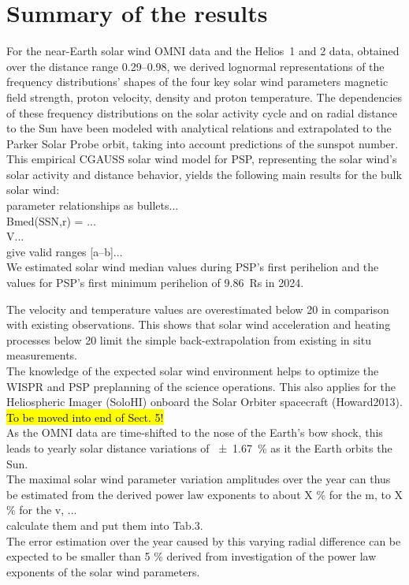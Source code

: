 \section{Summary of the results}
For the near-Earth solar wind OMNI data and the Helios~1 and 2 data, obtained over the distance range \SIrange{0.29}{0.98}{\au}, we derived lognormal representations of the frequency distributions’ shapes of the four key solar wind parameters magnetic field strength, proton velocity, density and proton temperature. The dependencies of these frequency distributions on the solar activity cycle and on radial distance to the Sun have been modeled with analytical relations and extrapolated to the Parker Solar Probe orbit, taking into account predictions of the sunspot number. This empirical CGAUSS solar wind model for PSP, representing the solar wind’s solar activity and distance behavior, yields the following main results for the bulk solar wind:\\

{\color{red}
parameter relationships as bullets...\\

Bmed(SSN,r) = ...\\
V...\\
give valid ranges [a--b]...\\
We estimated solar wind median values during PSP’s first perihelion and the values for PSP’s first minimum perihelion of 9.86~Rs in 2024.\\
}

The velocity and temperature values are overestimated below \SI{20}{\Rs} in comparison with existing observations. This shows that solar wind acceleration and heating processes below \SI{20}{\Rs} limit the simple back-extrapolation from existing in situ measurements.\\

The knowledge of the expected solar wind environment helps to optimize the WISPR and PSP preplanning of the science operations. This also applies for the Heliospheric Imager (SoloHI) onboard the Solar Orbiter spacecraft (Howard2013).\\




\hl{To be moved into end of Sect. 5!}\\
As the OMNI data are time-shifted to the nose of the Earth’s bow shock, this leads to yearly solar distance variations of \SI{+-1.67}{\%} as it the Earth orbits the Sun.\\
{\color{red}
The maximal solar wind parameter variation amplitudes over the year can thus be estimated from the derived power law exponents to about X \% for the m, to X \% for the v, ...\\
calculate them and put them into Tab.3.\\
The error estimation over the year caused by this varying radial difference can be expected to be smaller than 5 \% derived from investigation of the power law exponents of the solar wind parameters.\\
}

